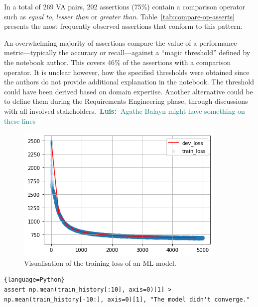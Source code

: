 \documentclass[conference]{IEEEtran}
\newcommand{\luis}[1]{\textcolor{teal}{\ding{46}~\textbf{Luis:~}#1}}
\begin{document}
In a total of 269 VA pairs, 202 assertions (75\%) contain a comparison operator such as \emph{equal to}, \emph{lesser than} or \emph{greater than}. Table~\ref{tab:compare-op-asserts} presents the most frequently observed assertions that conform to this pattern.

An overwhelming majority of assertions compare the value of a performance metric---typically the accuracy or recall---against a ``magic threshold'' defined by the notebook author. This covers 46\% of the assertions with a comparison operator. It is unclear however, how the specified thresholds were obtained since the authors do not provide additional explanation in the notebook. The threshold could have been derived based on domain expertise. Another alternative could be to define them during the Requirements Engineering phase, through discussions with all involved stakeholders\cite{CITEME}.\luis{Agathe Balayn might have something on these lines}

\begin{figure}
  \includegraphics[width=\linewidth]{../catalogue/select-16.png}
  \caption{Visualisation of the training loss of an ML model.}\label{fig:loss}
\end{figure}

\begin{lstlisting}[caption={Assertion to check that the mean of the first 10 observations of the loss is higher than the mean of the last 10 observations. In other words, the assertion checks if the loss function is converging to an optimal minima.}, label={lst:loss}]{language=Python}
assert np.mean(train_history[:10], axis=0)[1] > np.mean(train_history[-10:], axis=0)[1], "The model didn't converge."
\end{lstlisting}
\end{document}

